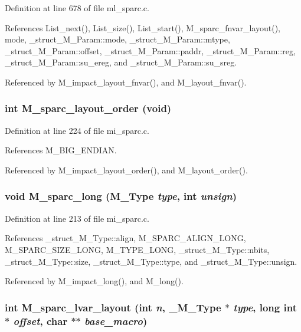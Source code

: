 Definition at line 678 of file ml\_\-sparc.c.

References List\_\-next(), List\_\-size(), List\_\-start(), M\_\-sparc\_\-fnvar\_\-layout(), mode, \_\-struct\_\-M\_\-Param::mode, \_\-struct\_\-M\_\-Param::mtype, \_\-struct\_\-M\_\-Param::offset, \_\-struct\_\-M\_\-Param::paddr, \_\-struct\_\-M\_\-Param::reg, \_\-struct\_\-M\_\-Param::su\_\-ereg, and \_\-struct\_\-M\_\-Param::su\_\-sreg.

Referenced by M\_\-impact\_\-layout\_\-fnvar(), and M\_\-layout\_\-fnvar().
\subsubsection{\setlength{\rightskip}{0pt plus 5cm}int M\_\-sparc\_\-layout\_\-order (void)}\label{m__sparc_8h_463a66976af8f550a894da2b07818175}




Definition at line 224 of file mi\_\-sparc.c.

References M\_\-BIG\_\-ENDIAN.

Referenced by M\_\-impact\_\-layout\_\-order(), and M\_\-layout\_\-order().
\subsubsection{\setlength{\rightskip}{0pt plus 5cm}void M\_\-sparc\_\-long (\bf{M\_\-Type} {\em type}, int {\em unsign})}\label{m__sparc_8h_e445333b13e05cf42cea88777d9ca0ae}




Definition at line 213 of file mi\_\-sparc.c.

References \_\-struct\_\-M\_\-Type::align, M\_\-SPARC\_\-ALIGN\_\-LONG, M\_\-SPARC\_\-SIZE\_\-LONG, M\_\-TYPE\_\-LONG, \_\-struct\_\-M\_\-Type::nbits, \_\-struct\_\-M\_\-Type::size, \_\-struct\_\-M\_\-Type::type, and \_\-struct\_\-M\_\-Type::unsign.

Referenced by M\_\-impact\_\-long(), and M\_\-long().
\subsubsection{\setlength{\rightskip}{0pt plus 5cm}int M\_\-sparc\_\-lvar\_\-layout (int {\em n}, \bf{\_\-M\_\-Type} $\ast$ {\em type}, long int $\ast$ {\em offset}, char $\ast$$\ast$ {\em base\_\-macro})}\label{m__sparc_8h_ff238cf52516106ab0e2bd5c56f374f3}





